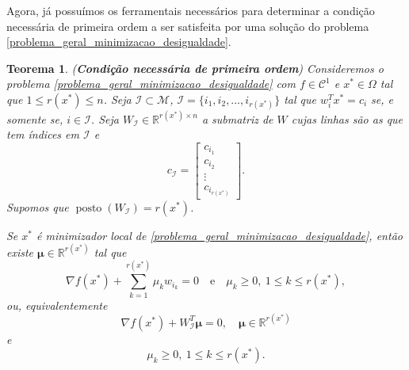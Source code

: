 \documentclass[12pt,a4paper]{scrartcl}
\DeclareMathOperator{\posto}{posto}
\def\RR{\mathds{R}}
\newtheorem{teo}{Teorema}
\theoremstyle{definition}%
\begin{document}
Agora, já possuímos os ferramentais necessários para determinar a condição necessária de primeira ordem a ser satisfeita por uma solução do problema \eqref{problema_geral_minimizacao_desigualdade}.



\begin{teo}(\textbf{Condição necessária de primeira ordem}) \label{teo:condicao_necessaria_1ordem_restricao_desigualdade}
Consideremos o problema \eqref{problema_geral_minimizacao_desigualdade} com $f \in \mathcal{C}^{1}$ e $x^{*} \in \Omega$ tal que $1 \leq r(x^{*}) \leq n$. Seja $\mathcal{I} \subset \mathcal{M}$, $\mathcal{I} = \{ i_{1}, i_{2}, \ldots , i_{r(x^{*})} \}$ tal que $w_{i}^{T}x^{*} = c_{i}$ se, e somente se, $i\in \mathcal{I}$. Seja $W_{\mathcal{I}} \in \RR^{r(x^{*})\times n}$ a submatriz de $W$ cujas linhas são as que tem índices em $\mathcal{I}$ e 
\[
c_{\mathcal{I}} = \begin{bmatrix*} c_{i_{1}} \\ c_{i_{2}} \\ \vdots \\ c_{i_{r(x^{*})}} \end{bmatrix*} .
\]
Supomos que $\posto (W_{\mathcal{I}}) = r(x^{*})$.

Se $x^{*}$ é minimizador local de \eqref{problema_geral_minimizacao_desigualdade}, então existe $\boldsymbol{\mu} \in \RR^{r(x^{*})}$ tal que 
\[ \label{eq:condicao_necessaria_1ordem_restricao_desigualdade_somatorio}
\nabla f(x^{*}) + \sum_{k=1}^{r(x^{*})} \mu_{k} w_{i_{k}} = 0 \quad \text{e} \quad \mu_{k} \geq 0, \ 1\leq k\leq r(x^{*}),
\]
ou, equivalentemente
\[ \label{eq:condicao_necessaria_1ordem_restricao_desigualdade}
\nabla f(x^{*}) + W_{\mathcal{I}}^{T} \boldsymbol{\mu} =0, \quad \boldsymbol{\mu} \in \RR^{r(x^{*})}
\]
e
\[
\mu_{k} \geq 0, \ 1\leq k\leq r(x^{*}).
\]
\end{teo}
\end{document}
